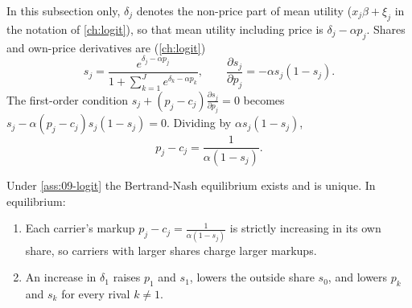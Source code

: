 In this subsection only, $\delta_j$ denotes the non-price part of mean utility ($x_j\beta+\xi_j$ in the
notation of \cref{ch:logit}), so that mean utility including price is $\delta_j-\alpha p_j$. Shares and
own-price derivatives are (\cref{ch:logit})
\begin{equation*}
s_j=\frac{e^{\delta_j-\alpha p_j}}{1+\sum_{k=1}^J e^{\delta_k-\alpha p_k}},
\qquad
\frac{\partial s_j}{\partial p_j}=-\alpha s_j(1-s_j).
\end{equation*}
The first-order condition $s_j+(p_j-c_j)\frac{\partial s_j}{\partial p_j}=0$ becomes
$s_j-\alpha(p_j-c_j)s_j(1-s_j)=0$. Dividing by $\alpha s_j(1-s_j)$,
\begin{equation}\label{eq:09-logit-markup}
p_j-c_j=\frac{1}{\alpha(1-s_j)} .
\end{equation}

\begin{proposition}\label{prop:09-dominance}
Under \cref{ass:09-logit} the Bertrand-Nash equilibrium exists and is unique. In equilibrium:
\begin{enumerate}[label=(\roman*)]
\item Each carrier's markup $p_j-c_j=\frac{1}{\alpha(1-s_j)}$ is strictly increasing in its own share, so
carriers with larger shares charge larger markups.
\item An increase in $\delta_1$ raises $p_1$ and $s_1$, lowers the outside share $s_0$, and lowers $p_k$
and $s_k$ for every rival $k\neq1$.
\end{enumerate}
\end{proposition}

